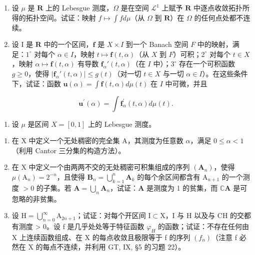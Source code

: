 \begin{enumerate}
\def\labelenumi{\arabic{enumi})}
\setcounter{enumi}{1}
\item
  设 \(\mu\) 是 \(\mathbf{R}\) 上的 Lebesgue 测度，\(\Omega\) 是在空间 \(\mathcal{L}^1\) 上赋予 \(\mathbf{R}\) 中逐点收敛拓扑所得的拓扑空间。试证：映射 \(f\mapsto \int fd\mu\)（从 \(\Omega\) 到 \(\mathbf{R}\)）在 \(\Omega\) 的任何点处都不连续。
\item
  设 I 是 \(\mathbf{R}\) 中的一个区间，\(\mathbf{f}\) 是 \(X \times I\) 到一个 Banach 空间 \(F\) 中的映射，满足：\(1^{\circ}\) 对每个 \(\alpha \in I\)，映射 \(t \mapsto \mathbf{f}(t, \alpha)\)（从 \(X\) 到 \(F\)）可积；\(2^{\circ}\) 对每个 \(t \in X\)，映射 \(\alpha \mapsto \mathbf{f}(t, \alpha)\) 有导数 \(\mathbf{f}_{\alpha}'(t, \alpha)\)（在 \(I\) 中）；\(3^{\circ}\) 存在一个可积函数 \(g \geqslant 0\)，使得 \(|\mathbf{f}_{\alpha}'(t, \alpha)| \leqslant g(t)\)（对一切 \(t \in X\) 与一切 \(\alpha \in I\)）。在这些条件下，试证：函数 \(\mathbf{u}(\alpha) = \int \mathbf{f}(t, \alpha) d\mu(t)\) 在 \(I\) 中可微，并且
\end{enumerate}

\[
\mathbf {u} ^ {\prime} (\alpha) = \int \mathbf {f} _ {\alpha} ^ {\prime} (t, \alpha) d \mu (t).
\]

\begin{enumerate}
\def\labelenumi{\arabic{enumi})}
\setcounter{enumi}{3}
\tightlist
\item
  设 \(\mu\) 是区间 \(X = [0,1]\) 上的 Lebesgue 测度。
\end{enumerate}

\begin{enumerate}
\def\labelenumi{\alph{enumi})}
\item
  在 X 中定义一个无处稠密的完全集 A，其测度为任意数 \(\alpha\)，满足 \(0 \leqslant \alpha < 1\)（利用 Cantor 三分集的构造方法）。
\item
  在 X 中定义一个由两两不交的无处稠密可积集组成的序列 \((\mathbf{A}_n)\)，使得 \(\mu (\mathrm{A}_n) = 2^{-n}\)，且使得 \(\mathbf{B}_n = \bigcup_{k = 1}^{n}\mathbf{A}_k\) 的每个余区间都含有 \(\mathrm{A}_{n + 1}\) 的一个测度 \(>0\) 的子集。若 \(\mathbf{A} = \bigcup_{n}\mathbf{A}_n\)，试证：\(\mathbf{A}\) 是测度为 1 的贫集，而 \(\mathbb{C}\mathbf{A}\) 是可忽略的非贫集。
\item
  设 \(\mathrm{H} = \bigcup_{n=0}^{\infty} \mathrm{A}_{2n+1}\)；试证：对每个开区间 \(\mathrm{I} \subset \mathrm{X}\)，I 与 H 以及与 CH 的交都有测度 \textgreater{} 0。设 f 是几乎处处等于特征函数 \(\varphi_{H}\) 的函数；试证：不存在任何由 X 上连续函数组成、在 X 的每点收敛且极限等于 f 的序列 \((f_{n})\)（注意 f 必然在 X 的每点不连续，并利用 GT, IX, §5 的习题 22）。
\end{enumerate}

